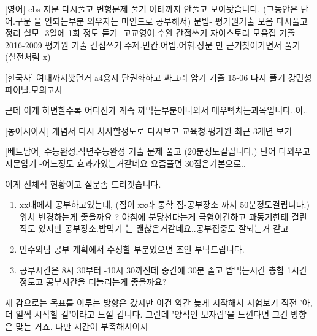     [영어]
    ebs 지문 다시풀고
    변형문제 풀기-여태까지 안풀고 모아놧습니다.
    (그동안은 단어.구문 을 안되는부분 외우자는 마인드로 공부해서)
    문법- 평가원기출 모음 다시풀고 정리
    실모 -3일에 1회 정도
    듣기 -고교영어.수완
    간접쓰기-자이스토리 모음집
    기출- 2016-2009 평가원 기출 간접쓰기.주제.빈칸.어법.어휘.장문 만 근거찾아가면서 풀기 (실전처럼 x)
    \vspace{5mm}

    [한국사]
    여태까지봣던거
    a4용지 단권화하고 싸그리 암기
    기출 15-06 다시 풀기
    강민성 파이널.모의고사
    \vspace{5mm}

    근데 이게 하면할수록 어디선가 계속 까먹는부분이나와서 매우빡치는과목입니다..아..
    \vspace{5mm}

    [동아시아사]
    개념서 다시 치사할정도로 다시보고
    교육청.평가원 최근 3개년 보기
    \vspace{5mm}

    [베트남어]
    수능완성.작년수능완성
    기출 문제 풀고 (20분정도걸립니다.)
    단어 다외우고 지문암기
    -어느정도 효과가있는거같네요 요즘풀면 30점은기본으로..
    \vspace{5mm}

    이게 전체적 현황이고
    질문좀 드리겟습니다.
    \vspace{5mm}
    \begin{enumerate}
        \item xx대에서 공부하고있는데, (집이 xx라 통학 집-공부장소 까지 50분정도걸립니다.)
        위치 변경하는게 좋을까요 ? 아침에 분당선타는게 극혐이긴하고 과동기한테 걸린적도 있지만
        공부장소.밥먹기 는 괜찮은거같네요..공부집중도 잘되는거 같고
        \vspace{5mm}
        
        \item 언수외탐 공부 계획에서 수정할 부분있으면 조언 부탁드립니다.
        \vspace{5mm}
        
        \item 공부시간은 8시 30부터 -10시 30까진데
        중간에 30분 졸고 밥먹는시간 총합 1시간 정도고
        공부시간을 더늘리는게 좋을까요?
    \end{enumerate}

    \vspace{5mm}

제 감으로는 목표를 이루는 방향은 갔지만 이건 약간 늦게 시작해서 시험보기 직전 '아, 더 일찍 시작할 걸'이라고 느낄 겁니다.
그런데 '양적인 모자람'을 느낀다면 그건 방향은 맞는 거죠. 다만 시간이 부족해서이지
\vspace{5mm}


